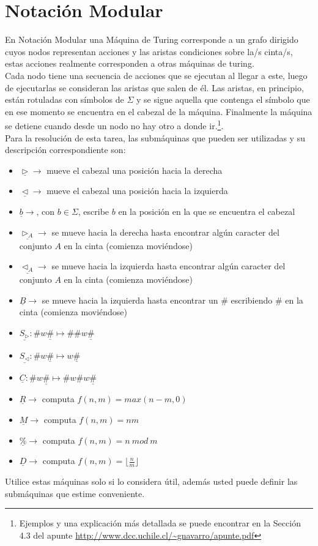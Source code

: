 \documentclass[dcc]{fcfmcourse}
\begin{document}
\section*{Notación Modular}
En Notación Modular una Máquina de Turing corresponde a un grafo dirigido cuyos nodos representan acciones y las aristas condiciones sobre la/s cinta/s, estas acciones realmente corresponden a otras máquinas de turing.\\
Cada nodo tiene una secuencia de acciones que se ejecutan al llegar a este, luego de ejecutarlas se consideran las aristas que salen de él. Las aristas, en principio, están rotuladas con símbolos de $\Sigma$ y se sigue aquella que contenga el símbolo que en ese momento se encuentra en el cabezal de la máquina. Finalmente la máquina se detiene cuando desde un nodo no hay otro a donde ir.\footnote{Ejemplos y una explicación más detallada se puede encontrar en la Sección 4.3 del apunte \url{http://www.dcc.uchile.cl/~gnavarro/apunte.pdf}}.\\

Para la resolución de esta tarea, las submáquinas que pueden ser utilizadas y su descripción correspondiente son:
\begin{itemize}
\item $\underline{\rhd} \to$ mueve el cabezal una posición hacia la derecha
\item $\underline{\lhd} \to$ mueve el cabezal una posición hacia la izquierda
\item $\underline{b} \to$, con $b\in\Sigma$, escribe $b$ en la posición en la que se encuentra el cabezal
\item $\underline{\rhd_{A}} \to$ se mueve hacia la derecha hasta encontrar algún caracter del conjunto $A$ en la cinta (comienza moviéndose)
\item $\underline{\lhd_{A}} \to$ se mueve hacia la izquierda hasta encontrar algún caracter del conjunto $A$ en la cinta (comienza moviéndose)
\item $\underline{B} \to$ se mueve hacia la izquierda hasta encontrar un $\#$ escribiendo $\#$ en la cinta (comienza moviéndose)
\item $\underline{S_{\rhd}}\colon \#w\underline{\#} \mapsto \#\#w\underline{\#}$
\item $\underline{S_{\lhd}}\colon \#w\underline{\#} \mapsto w\underline{\#}$
\item $\underline{C}\colon \#w\underline{\#} \mapsto \#w\#w\underline{\#}$
\item $\underline{R}\to$ computa $f(n,m)=max(n-m,0)$
\item $\underline{M}\to$ computa $f(n,m)=nm$
\item $\underline{\%}\to$ computa $f(n,m)=n\ mod\ m$
\item $\underline{D}\to$ computa $f(n,m)=\lfloor \frac{n}{m} \rfloor$
\end{itemize}
Utilice estas máquinas solo si lo considera útil, además usted puede definir las submáquinas que estime conveniente.
\end{document}
